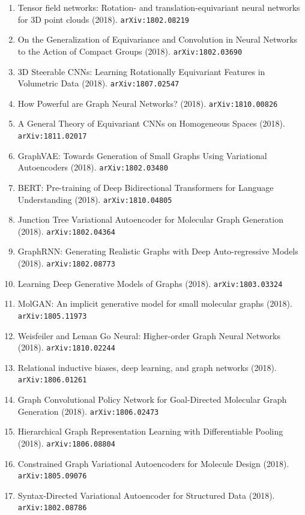 \documentclass[11pt]{article}
\begin{document}
\begin{enumerate}
  Graphs (2017). \texttt{arXiv:1704.02901}
  \item Tensor field networks: Rotation- and translation-equivariant neural
  networks for 3D point clouds (2018). \texttt{arXiv:1802.08219}
  \item On the Generalization of Equivariance and Convolution in Neural Networks
  to the Action of Compact Groups (2018). \texttt{arXiv:1802.03690}
  \item 3D Steerable CNNs: Learning Rotationally Equivariant Features in
  Volumetric Data (2018). \texttt{arXiv:1807.02547}
  \item How Powerful are Graph Neural Networks? (2018). \texttt{arXiv:1810.00826}
  \item A General Theory of Equivariant CNNs on Homogeneous Spaces (2018). \texttt{arXiv:1811.02017}
  \item GraphVAE: Towards Generation of Small Graphs Using Variational
  Autoencoders (2018). \texttt{arXiv:1802.03480}
  \item BERT: Pre-training of Deep Bidirectional Transformers for Language
  Understanding (2018). \texttt{arXiv:1810.04805}
  \item Junction Tree Variational Autoencoder for Molecular Graph Generation (2018). \texttt{arXiv:1802.04364}
  \item GraphRNN: Generating Realistic Graphs with Deep Auto-regressive Models (2018). \texttt{arXiv:1802.08773}
  \item Learning Deep Generative Models of Graphs (2018). \texttt{arXiv:1803.03324}
  \item MolGAN: An implicit generative model for small molecular graphs (2018). \texttt{arXiv:1805.11973}
  \item Weisfeiler and Leman Go Neural: Higher-order Graph Neural Networks (2018). \texttt{arXiv:1810.02244}
  \item Relational inductive biases, deep learning, and graph networks (2018). \texttt{arXiv:1806.01261}
  \item Graph Convolutional Policy Network for Goal-Directed Molecular Graph
  Generation (2018). \texttt{arXiv:1806.02473}
  \item Hierarchical Graph Representation Learning with Differentiable Pooling (2018). \texttt{arXiv:1806.08804}
  \item Constrained Graph Variational Autoencoders for Molecule Design (2018). \texttt{arXiv:1805.09076}
  \item Syntax-Directed Variational Autoencoder for Structured Data (2018). \texttt{arXiv:1802.08786}

\end{enumerate}
\end{document}
